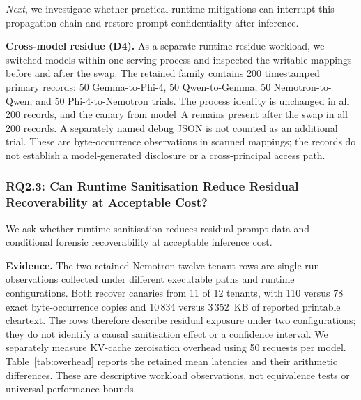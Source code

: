 \documentclass[journal,tifs]{IEEEtran}
\begin{document}
\textit{Next}, we investigate whether practical runtime mitigations can interrupt
this propagation chain and restore prompt confidentiality after
inference.


{\bf Cross-model residue (D4).}
As a separate runtime-residue workload, we switched models within one
serving process and inspected the writable mappings before and after the
swap. The retained family contains 200 timestamped primary records: 50
Gemma-to-Phi-4, 50 Qwen-to-Gemma, 50 Nemotron-to-Qwen, and 50
Phi-4-to-Nemotron trials. The process identity is unchanged in all 200
records, and the canary from model~A remains present after the swap in all
200 records. A separately named debug JSON is not counted as an additional
trial. These are byte-occurrence observations in scanned mappings; the
records do not establish a model-generated disclosure or a cross-principal
access path.


\subsubsection{RQ2.3: Can Runtime Sanitisation Reduce Residual
Recoverability at Acceptable Cost?}
\label{sec:rq2_mitigation}

We ask whether runtime sanitisation reduces residual prompt data and
conditional forensic recoverability at acceptable inference cost.


{\bf Evidence.}
The two retained Nemotron twelve-tenant rows are single-run observations collected
under different executable paths and runtime configurations. Both recover
canaries from 11 of 12 tenants, with 110 versus 78 exact byte-occurrence
copies and 10\,834 versus 3\,352~KB of reported printable cleartext. The
rows therefore describe residual exposure under two configurations; they
do not identify a causal sanitisation effect or a confidence interval.
We separately measure KV-cache zeroisation overhead using 50 requests per
model. Table~\ref{tab:overhead} reports the retained mean latencies and
their arithmetic differences. These are descriptive workload observations,
not equivalence tests or universal performance bounds.
\end{document}
